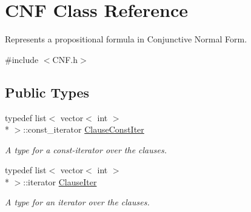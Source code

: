 \hypertarget{classCNF}{\section{C\-N\-F Class Reference}
\label{classCNF}
}


Represents a propositional formula in Conjunctive Normal Form.  




{\ttfamily \#include $<$C\-N\-F.\-h$>$}

\subsection*{Public Types}
\begin{DoxyCompactItemize}
\item 
typedef list$<$ vector$<$ int $>$\\*
 $>$\-::const\-\_\-iterator \hyperlink{classCNF_a0d29737450f8bbc9f8549235577881ec}{Clause\-Const\-Iter}
\begin{DoxyCompactList}\small\item\em A type for a const-\/iterator over the clauses. \end{DoxyCompactList}\item 
typedef list$<$ vector$<$ int $>$\\*
 $>$\-::iterator \hyperlink{classCNF_a6bb7b9142923d0af71a49e4b29c258d1}{Clause\-Iter}
\begin{DoxyCompactList}\small\item\em A type for an iterator over the clauses. \end{DoxyCompactList}\end{DoxyCompactItemize}
